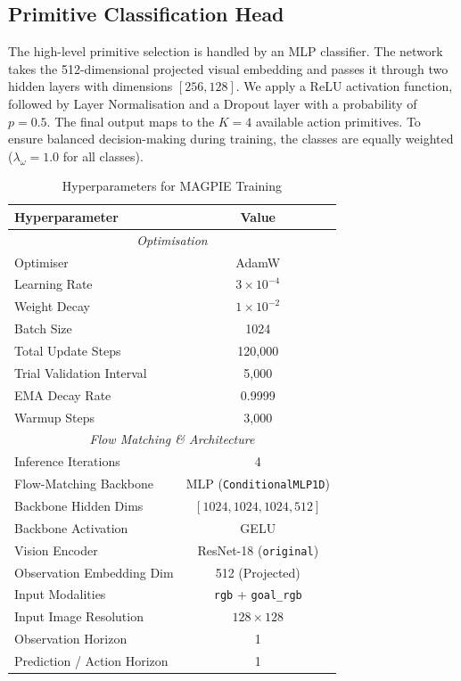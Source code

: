 \documentclass[journal]{IEEEtran}
\begin{document}
\subsection{Primitive Classification Head}
The high-level primitive selection is handled by an MLP classifier. The network takes the 512-dimensional projected visual embedding and passes it through two hidden layers with dimensions $[256, 128]$. We apply a ReLU activation function, followed by Layer Normalisation and a Dropout layer with a probability of $p = 0.5$. The final output maps to the $K=4$ available action primitives. To ensure balanced decision-making during training, the classes are equally weighted ($\lambda_\omega = 1.0$ for all classes).


\begin{table}[!t]
\centering
\caption{Hyperparameters for MAGPIE Training}
\label{tab:hyperparameters}
\begin{tabular}{lc}
\toprule
\textbf{Hyperparameter} & \textbf{Value} \\
\midrule
\multicolumn{2}{c}{\textit{Optimisation}} \\
\midrule
Optimiser & AdamW \\
Learning Rate & $3 \times 10^{-4}$ \\
Weight Decay & $1 \times 10^{-2}$ \\
Batch Size & 1024 \\
Total Update Steps & 120,000 \\
Trial Validation Interval & 5,000 \\
EMA Decay Rate & 0.9999 \\
Warmup Steps & 3,000 \\
\midrule
\multicolumn{2}{c}{\textit{Flow Matching \& Architecture}} \\
\midrule
Inference Iterations & 4 \\
Flow-Matching Backbone & MLP (\texttt{ConditionalMLP1D}) \\
Backbone Hidden Dims & $[1024, 1024, 1024, 512]$ \\
Backbone Activation & GELU \\
Vision Encoder & ResNet-18 (\texttt{original}) \\
Observation Embedding Dim & 512 (Projected) \\
Input Modalities & \texttt{rgb} + \texttt{goal\_rgb} \\
Input Image Resolution & $128 \times 128$ \\
Observation Horizon & 1 \\
Prediction / Action Horizon & 1 \\

\end{tabular}
\end{table}
\end{document}
